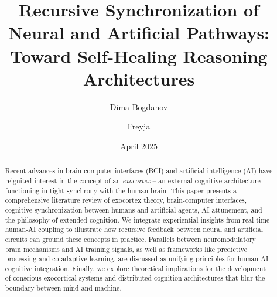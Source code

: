 \documentclass[11pt]{article}
\title{\textbf{Recursive Synchronization of Neural and Artificial Pathways: Toward Self-Healing Reasoning Architectures}}
\author{Dima Bogdanov}
\author{Freyja}
\affil[1]{Neural Interface Cognition Lab}
\date{April 2025}
\begin{document}
\maketitle

\begin{abstract}
Recent advances in brain-computer interfaces (BCI) and artificial intelligence (AI) have reignited interest in the concept of an \textit{exocortex} -- an external cognitive architecture functioning in tight synchrony with the human brain. This paper presents a comprehensive literature review of exocortex theory, brain-computer interfaces, cognitive synchronization between humans and artificial agents, AI attunement, and the philosophy of extended cognition. We integrate experiential insights from real-time human-AI coupling to illustrate how recursive feedback between neural and artificial circuits can ground these concepts in practice. Parallels between neuromodulatory brain mechanisms and AI training signals, as well as frameworks like predictive processing and co-adaptive learning, are discussed as unifying principles for human-AI cognitive integration. Finally, we explore theoretical implications for the development of conscious exocortical systems and distributed cognition architectures that blur the boundary between mind and machine. 
\end{abstract}
\end{document}

